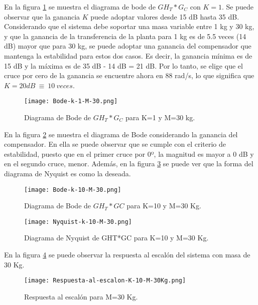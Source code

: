 \noindent En la figura \ref{fig:bode-analog-compensado-para-k-1} se muestra el diagrama de bode de ${GH}_T*G_C$ con $K=1$. Se puede observar que la ganancia $K$ puede adoptar valores desde 15 dB hasta 35 dB. Considerando que el sistema debe soportar una masa variable entre 1 kg y 30 kg, y que la ganancia de la transferencia de la planta para 1 kg es de 5.5 veces (14 dB) mayor que para 30 kg, se puede adoptar una ganancia del compensador que mantenga la estabilidad para estos dos casos. Es decir, la ganancia m\'{i}nima es de 15 dB y la m\'{a}xima es de 35 dB - 14 dB = 21 dB. Por lo tanto, se elige que el cruce por cero de la ganancia se encuentre ahora en 88 rad/s, lo que significa que $K=20dB\ \equiv \ 10\ veces$.


\begin{figure}[H]
	\centering
	\texttt{[image: Bode-k-1-M-30.png]}
	\caption{Diagrama de Bode de $GH_T*G_C$ para K=1 y M=30 kg.}
	\label{fig:bode-analog-compensado-para-k-1}
\end{figure}

\noindent En la figura \ref{fig:bode-analog-compensado-para-k-10} se muestra el diagrama de Bode considerando la ganancia del compensador. En ella se puede observar que se  cumple con el criterio de estabilidad, puesto que en el primer cruce por 0º, la magnitud es mayor a 0 dB y en el segundo cruce, menor. Adem\'{a}s, en la figura \ref{fig:nyquist-analog-para-k-10} se puede ver que la forma del diagrama de Nyquist es como la deseada.

\begin{figure}[H]
	\centering
	\texttt{[image: Bode-k-10-M-30.png]}
	\caption{Diagrama de Bode de $GH_{T}*GC$ para K=10 y M=30 Kg.}
	\label{fig:bode-analog-compensado-para-k-10}
\end{figure}

\begin{figure}[H]
	\centering
	\texttt{[image: Nyquist-k-10-M-30.png]}
	\caption{Diagrama de Nyquist de GHT*GC para K=10 y M=30 Kg.}
	\label{fig:nyquist-analog-para-k-10}
\end{figure}

\noindent En la figura \ref{fig:rta-escalon-k-10-m-30} se puede observar la respuesta al escalón del sistema con masa de 30 Kg.

\begin{figure}[H]
	\centering
	\texttt{[image: Respuesta-al-escalon-K-10-M-30Kg.png]}
	\caption{Respuesta al escalón para M=30 Kg.}
	\label{fig:rta-escalon-k-10-m-30}
\end{figure}

